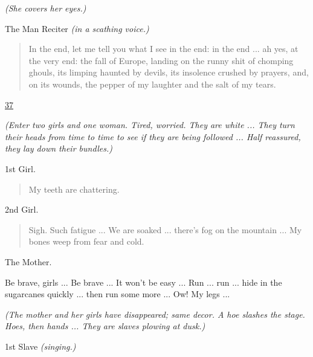 \documentclass[letterpaper,article,12pt,oneside,notitlepage]{memoir}
\begin{document}
\textit{(She covers her eyes.)}

\begin{center}The Man Reciter \textit{(in a scathing voice.)}\end{center}

\begin{verse}
\indent In the end, let me tell you what I see in the end: in the end ... ah yes, at the very end: the fall of Europe, landing on the runny shit of chomping ghouls, its limping haunted by devils, its insolence crushed by prayers, and, on its wounds, the pepper of my laughter and the salt of my tears. \\
\end{verse}

\clearpage

\href{http://cesaire.elotroalex.com/chiens/chiens/p037.html}{37}

\textit{(Enter two girls and one woman. Tired, worried. They are white ... They turn their heads from time to time to see if they are being followed ... Half reassured, they lay down their bundles.)}

\begin{center}1st Girl.\end{center}

\begin{verse}
\hspace{1cm} My teeth are chattering. \\
\end{verse}

\begin{center}2nd Girl.\end{center}

\begin{verse}
\indent Sigh. Such fatigue ... We are soaked ... there's fog on the mountain ... My bones weep from fear and cold. \\
\end{verse}

\begin{center}The Mother.\end{center}

Be brave, girls ... Be brave ... It won't be easy ... Run ... run ... hide in the sugarcanes quickly ... then run some more ... Ow! My legs ...

\textit{(The mother and her girls have disappeared; same decor. A hoe slashes the stage. Hoes, then hands ... They are slaves plowing at dusk.)}

\begin{center}1st Slave \textit{(singing.)}\end{center}
\end{document}
